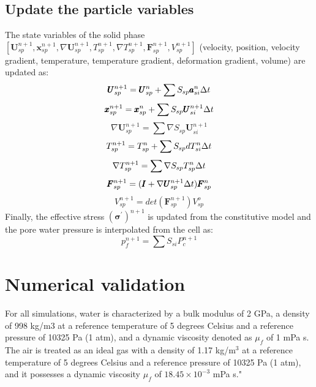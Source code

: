 \documentclass[preprint,12pt]{elsarticle}
\begin{document}
\subsection{\textsf{Update the particle variables}}
%
%
The state variables of the solid phase $[\pmb{U}_{sp}^{n+1},\pmb{x}_{sp}^{n+1},\nabla \pmb{U}_{sp}^{n+1}, T_{sp}^{n+1},  \nabla T_{sp}^{n+1}, \pmb{F}_{sp}^{n+1},V_{sp}^{n+1}]$ (velocity, position, velocity gradient, temperature, temperature gradient, deformation gradient, volume) are updated as: 
%
%
\begin{equation}
     \pmb{U}_{sp}^{n+1} = \pmb{U}_{sp}^n + \sum{S_{sp} \pmb{a}_{si}^n \ensuremath{\Delta{t}} } 
\end {equation}
%
%
\begin{equation}
     \pmb{x}_{sp}^{n+1} = \pmb{x}_{sp}^n + \sum{S_{sp} \pmb{U}_{si}^{n+1} \ensuremath{\Delta{t}} } 
\end {equation}
%
%
\begin{equation}
    \nabla \pmb{U}_{sp}^{n+1} = \sum{\nabla S_{sp} \pmb{U}_{si}^{n+1}} 
\end {equation}
%
%
\begin{equation}
     T_{sp}^{n+1} = T_{sp}^n + \sum{S_{sp} dT_{si}^n \ensuremath{\Delta{t}} } 
\end {equation}
%
%
\begin{equation}
     \nabla T_{sp}^{n+1} = \sum{\nabla S_{sp} T_{sp}^n \ensuremath{\Delta{t}} } 
\end {equation}
%
%
\begin{equation}
     \pmb{F}_{sp}^{n+1} = (\pmb{I} + \nabla \pmb{U}_{sp}^{n+1} \Delta{t})\pmb{F}_{sp}^n
\end {equation}
%
%
\begin{equation}
     V_{sp}^{n+1} = det(\pmb{F}_{sp}^{n+1}) V_{sp}^o
\end {equation}
%
%
Finally, the effective stress $(\pmb{\sigma}^\prime)^{n+1}$ is updated from the constitutive model and the pore water pressure is interpolated from the cell as:
%
%
\begin{equation}
     p_{f}^{n+1} = \sum{S_{si} P_{c}^{n+1}} 
\end {equation}
%
%
\section{\textsf{Numerical validation}}
For all simulations, water is characterized by a bulk modulus of 2 GPa, a density of 998 kg/m3 at a reference temperature of 5 degrees Celsius and a reference pressure of 10325 Pa (1 atm), and a dynamic viscosity denoted as $\mu_f$ of 1 mPa s. The air is treated as an ideal gas with a density of 1.17 kg/m$^{3}$ at a reference temperature of 5 degrees Celsius and a reference pressure of 10325 Pa (1 atm), and it possesses a dynamic viscosity $\mu_f$ of $18.45 \times 10^{-3}$ mPa s."
\end{document}
